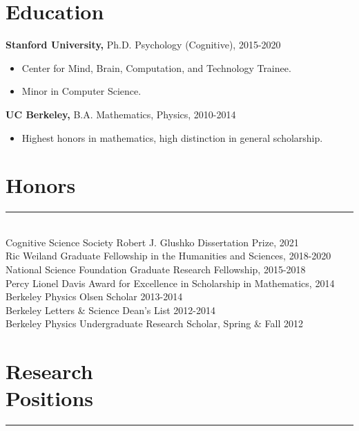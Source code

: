 \documentclass[margin]{res}
\begin{document}
 
 
 
\address{{\bf Email} \\ andrewlampinen@gmail.com}
\address{{\bf Website} \\\url{https://lampinen.github.io}}
\begin{resume} 
\section{Education} 
{\bf Stanford University,} Ph.D. Psychology (Cognitive), 2015-2020
\begin{itemize} \itemsep -2pt \item Center for Mind, Brain, Computation, and Technology Trainee. \item Minor in Computer Science.\end{itemize}
{\bf UC Berkeley,}  B.A. Mathematics, Physics, 2010-2014 \begin{itemize} \itemsep -2pt \item Highest honors in mathematics, high distinction in general scholarship.%
\end{itemize}
\vspace{1pt}\section{Honors} \vspace{-15pt} \rule{\textwidth}{0.5pt} \\[3pt]
Cognitive Science Society Robert J. Glushko Dissertation Prize, 2021 \\
Ric Weiland Graduate Fellowship in the Humanities and Sciences, 2018-2020 \\
National Science Foundation Graduate Research Fellowship, 2015-2018 \\
Percy Lionel Davis Award for Excellence in Scholarship in Mathematics, 2014 \\ 
Berkeley Physics Olsen Scholar 2013-2014 \\
Berkeley Letters \& Science Dean's List 2012-2014\\
Berkeley Physics Undergraduate Research Scholar, Spring \& Fall 2012
\vspace{1pt}\section{Research\\Positions} \vspace{-15pt} \rule{\textwidth}{0.5pt} \\[3pt]

\end{resume}
\end{document}
